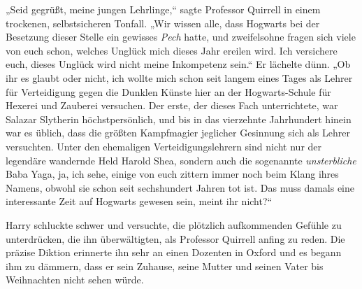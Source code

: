 „Seid gegrüßt, meine jungen Lehrlinge,“ sagte Professor Quirrell in einem trockenen, selbstsicheren Tonfall. „Wir wissen alle, dass Hogwarts bei der Besetzung dieser Stelle ein gewisses \emph{Pech} hatte, und zweifelsohne fragen sich viele von euch schon, welches Unglück mich dieses Jahr ereilen wird. Ich versichere euch, dieses Unglück wird nicht meine Inkompetenz sein.“ Er lächelte dünn. „Ob ihr es glaubt oder nicht, ich wollte mich schon seit langem eines Tages als Lehrer für Verteidigung gegen die Dunklen Künste hier an der Hogwarts-Schule für Hexerei und Zauberei versuchen. Der erste, der dieses Fach unterrichtete, war Salazar Slytherin höchstpersönlich, und bis in das vierzehnte Jahrhundert hinein war es üblich, dass die größten Kampfmagier jeglicher Gesinnung sich als Lehrer versuchten. Unter den ehemaligen Verteidigungslehrern sind nicht nur der legendäre wandernde Held Harold Shea, sondern auch die sogenannte \emph{unsterbliche} Baba Yaga, ja, ich sehe, einige von euch zittern immer noch beim Klang ihres Namens, obwohl sie schon seit sechshundert Jahren tot ist. Das muss damals eine interessante Zeit auf Hogwarts gewesen sein, meint ihr nicht?“

Harry schluckte schwer und versuchte, die plötzlich aufkommenden Gefühle zu unterdrücken, die ihn überwältigten, als Professor Quirrell anfing zu reden. Die präzise Diktion erinnerte ihn sehr an einen Dozenten in Oxford und es begann ihm zu dämmern, dass er sein Zuhause, seine Mutter und seinen Vater bis Weihnachten nicht sehen würde.

